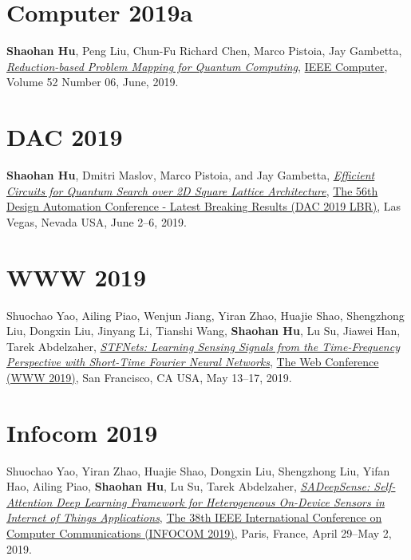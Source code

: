 \section{\sc Computer 2019a}\hypertarget{hu2019computer}{}
\textbf{Shaohan Hu}, Peng Liu, Chun-Fu Richard Chen, Marco Pistoia, Jay Gambetta,
\href{https://doi.ieeecomputersociety.org/10.1109/MC.2019.2909709}{\emph{Reduction-based Problem Mapping for Quantum Computing}},
\href{https://www.computer.org/csdl/magazines/co}{\textsf{IEEE Computer}},
Volume 52 Number 06, June, 2019.

\section{\sc DAC 2019}\hypertarget{hu2019dac}{}
\textbf{Shaohan Hu}, Dmitri Maslov, Marco Pistoia, and Jay Gambetta,
\href{https://dl.acm.org/citation.cfm?id=3316781.3322464}{\emph{Efficient Circuits for Quantum Search over 2D Square Lattice Architecture}},
\href{https://dac.com/late-breaking-results}{\textsf{The 56th Design Automation Conference - Latest Breaking Results (DAC 2019 LBR)}},
Las Vegas, Nevada USA, June 2--6, 2019.

\section{\sc WWW 2019}\hypertarget{yao2019www}{}
Shuochao Yao, Ailing Piao, Wenjun Jiang, Yiran Zhao, Huajie Shao, Shengzhong Liu, Dongxin Liu, Jinyang Li, Tianshi Wang, \textbf{Shaohan Hu}, Lu Su, Jiawei Han, Tarek Abdelzaher,
\href{https://dl.acm.org/citation.cfm?id=3313426}{\emph{STFNets: Learning Sensing Signals from the Time-Frequency Perspective with Short-Time Fourier Neural Networks}},
\href{https://www2019.thewebconf.org/}{\textsf{The Web Conference (WWW 2019)}},
San Francisco, CA USA, May 13--17, 2019.

\section{\sc Infocom 2019}\hypertarget{yao2019infocom}{}
Shuochao Yao, Yiran Zhao, Huajie Shao, Dongxin Liu, Shengzhong Liu, Yifan Hao, Ailing Piao, \textbf{Shaohan Hu}, Lu Su, Tarek Abdelzaher,
\href{https://ieeexplore.ieee.org/document/8737500}{\emph{SADeepSense: Self-Attention Deep Learning Framework for Heterogeneous On-Device Sensors in Internet of Things Applications}},
\href{https://infocom2019.ieee-infocom.org/}{\textsf{The 38th IEEE International Conference on Computer Communications (INFOCOM 2019)}},
Paris, France, April 29--May 2, 2019.

